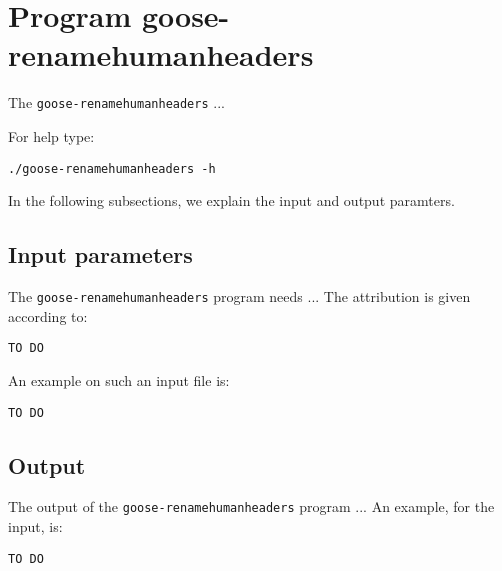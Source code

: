 \section{Program goose-renamehumanheaders}
The \texttt{goose-renamehumanheaders} ...

For help type:
\begin{lstlisting}
./goose-renamehumanheaders -h
\end{lstlisting}
In the following subsections, we explain the input and output paramters.

\subsection*{Input parameters}

The \texttt{goose-renamehumanheaders} program needs ...
The attribution is given according to:
\begin{lstlisting}
TO DO
\end{lstlisting}

An example on such an input file is:
\begin{lstlisting}
TO DO
\end{lstlisting}

\subsection*{Output}
The output of the \texttt{goose-renamehumanheaders} program ...
An example, for the input, is:
\begin{lstlisting}
TO DO
\end{lstlisting}
